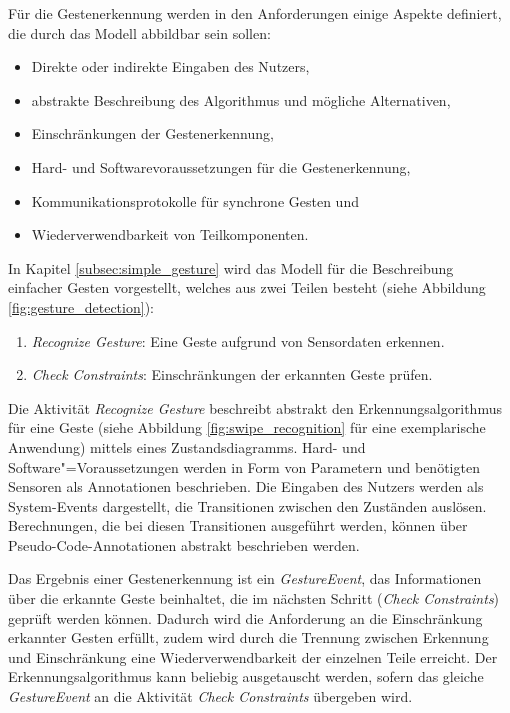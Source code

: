 Für die Gestenerkennung werden in den Anforderungen einige Aspekte definiert, die durch das Modell abbildbar sein sollen:
\begin{itemize}
\item Direkte oder indirekte Eingaben des Nutzers,
\item abstrakte Beschreibung des Algorithmus und mögliche Alternativen,
\item Einschränkungen der Gestenerkennung,
\item Hard- und Softwarevoraussetzungen für die Gestenerkennung,
\item Kommunikationsprotokolle für synchrone Gesten und
\item Wiederverwendbarkeit von Teilkomponenten.
\end{itemize}
In Kapitel \ref{subsec:simple_gesture} wird das Modell für die Beschreibung einfacher Gesten vorgestellt, welches aus zwei Teilen besteht (siehe Abbildung \ref{fig:gesture_detection}):
\begin{enumerate}
\item \textit{Recognize Gesture}: Eine Geste aufgrund von Sensordaten erkennen.
\item \textit{Check Constraints}: Einschränkungen der erkannten Geste prüfen.
\end{enumerate} 
Die Aktivität \textit{Recognize Gesture} beschreibt abstrakt den Erkennungsalgorithmus für eine Geste (siehe Abbildung \ref{fig:swipe_recognition} für eine exemplarische Anwendung) mittels eines Zustandsdiagramms. Hard- und Software"=Voraussetzungen werden in Form von Parametern und benötigten Sensoren als Annotationen beschrieben. Die Eingaben des Nutzers werden als System-Events dargestellt, die Transitionen zwischen den Zuständen auslösen. Berechnungen, die bei diesen Transitionen ausgeführt werden, können über Pseudo-Code-Annotationen abstrakt beschrieben werden. 

Das Ergebnis einer Gestenerkennung ist ein \textit{GestureEvent}, das Informationen über die erkannte Geste beinhaltet, die im nächsten Schritt (\textit{Check Constraints}) geprüft werden können. Dadurch wird die Anforderung an die Einschränkung erkannter Gesten erfüllt, zudem wird durch die Trennung zwischen Erkennung und Einschränkung eine Wiederverwendbarkeit der einzelnen Teile erreicht. Der Erkennungsalgorithmus kann beliebig ausgetauscht werden, sofern das gleiche \textit{GestureEvent} an die Aktivität \textit{Check Constraints} übergeben wird.

